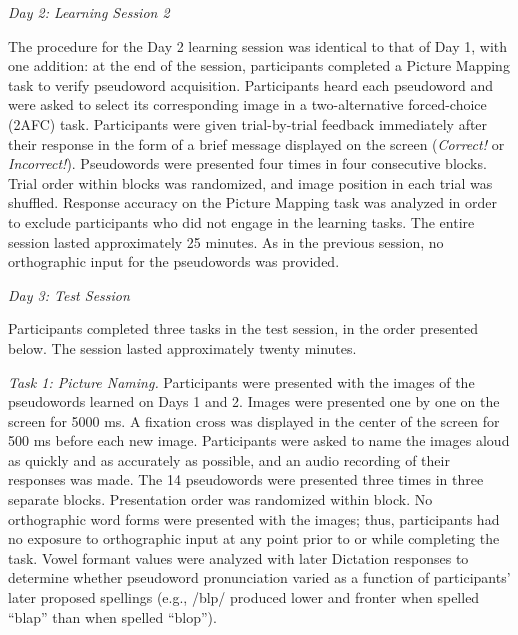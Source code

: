 \documentclass[
  english,
  man,floatsintext]{apa7}
\begin{document}
\emph{Day 2: Learning Session 2}

The procedure for the Day 2 learning session was identical to that of Day 1, with one addition: at the end of the session, participants completed a Picture Mapping task to verify pseudoword acquisition. Participants heard each pseudoword and were asked to select its corresponding image in a two-alternative forced-choice (2AFC) task. Participants were given trial-by-trial feedback immediately after their response in the form of a brief message displayed on the screen (\emph{Correct!} or \emph{Incorrect!}). Pseudowords were presented four times in four consecutive blocks. Trial order within blocks was randomized, and image position in each trial was shuffled. Response accuracy on the Picture Mapping task was analyzed in order to exclude participants who did not engage in the learning tasks. The entire session lasted approximately 25 minutes. As in the previous session, no orthographic input for the pseudowords was provided.

\emph{Day 3: Test Session}

Participants completed three tasks in the test session, in the order presented below. The session lasted approximately twenty minutes.

\emph{Task 1: Picture Naming.} Participants were presented with the images of the pseudowords learned on Days 1 and 2. Images were presented one by one on the screen for 5000 ms. A fixation cross was displayed in the center of the screen for 500 ms before each new image. Participants were asked to name the images aloud as quickly and as accurately as possible, and an audio recording of their responses was made. The 14 pseudowords were presented three times in three separate blocks. Presentation order was randomized within block. No orthographic word forms were presented with the images; thus, participants had no exposure to orthographic input at any point prior to or while completing the task. Vowel formant values were analyzed with later Dictation responses to determine whether pseudoword pronunciation varied as a function of participants' later proposed spellings (e.g., /bl\textscripta p/ produced lower and fronter when spelled ``blap'' than when spelled ``blop'').
\end{document}
